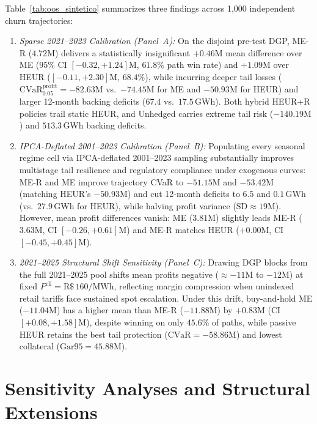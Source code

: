 \documentclass[10pt,journal]{IEEEtran}
\begin{document}
Table~\ref{tab:oos_sintetico} summarizes three findings across 1,000 independent churn trajectories:
\begin{enumerate}
    \item \textit{Sparse 2021--2023 Calibration (Panel~A):} On the disjoint pre-test DGP, ME-R ($4.72\text{M}$) delivers a statistically insignificant $+0.46\text{M}$ mean difference over ME ($95\%$ CI $[-0.32, +1.24]\text{M}$, $61.8\%$ path win rate) and $+1.09\text{M}$ over HEUR ($[-0.11, +2.30]\text{M}$, $68.4\%$), while incurring deeper tail losses ($\mathrm{CVaR}_{0.05}^{\mathrm{profit}} = -82.63\text{M}$ vs.\ $-74.45\text{M}$ for ME and $-50.93\text{M}$ for HEUR) and larger 12-month backing deficits ($67.4$ vs.\ $17.5\,\text{GWh}$). Both hybrid HEUR+R policies trail static HEUR, and Unhedged carries extreme tail risk ($-140.19\text{M}$) and $513.3\,\text{GWh}$ backing deficits.
    \item \textit{IPCA-Deflated 2001--2023 Calibration (Panel~B):} Populating every seasonal regime cell via IPCA-deflated 2001--2023 sampling substantially improves multistage tail resilience and regulatory compliance under exogenous curves: ME-R and ME improve trajectory CVaR to $-51.15\text{M}$ and $-53.42\text{M}$ (matching HEUR's $-50.93\text{M}$) and cut 12-month deficits to $6.5$ and $0.1\,\text{GWh}$ (vs.\ $27.9\,\text{GWh}$ for HEUR), while halving profit variance ($\text{SD} \approx 19\text{M}$). However, mean profit differences vanish: ME ($3.81\text{M}$) slightly leads ME-R ($3.63\text{M}$, CI $[-0.26, +0.61]\text{M}$) and ME-R matches HEUR ($+0.00\text{M}$, CI $[-0.45, +0.45]\text{M}$).
    \item \textit{2021--2025 Structural Shift Sensitivity (Panel~C):} Drawing DGP blocks from the full 2021--2025 pool shifts mean profits negative ($\approx -11\text{M}$ to $-12\text{M}$) at fixed $P^{\text{cli}} = \text{R\$}\,160/\text{MWh}$, reflecting margin compression when unindexed retail tariffs face sustained spot escalation. Under this drift, buy-and-hold ME ($-11.04\text{M}$) has a higher mean than ME-R ($-11.88\text{M}$) by $+0.83\text{M}$ (CI $[+0.08, +1.58]\text{M}$), despite winning on only $45.6\%$ of paths, while passive HEUR retains the best tail protection ($\mathrm{CVaR} = -58.86\text{M}$) and lowest collateral ($\text{Gar95} = 45.88\text{M}$).
\end{enumerate}

\section{Sensitivity Analyses and Structural Extensions}
\label{sec:sens}
\end{document}
